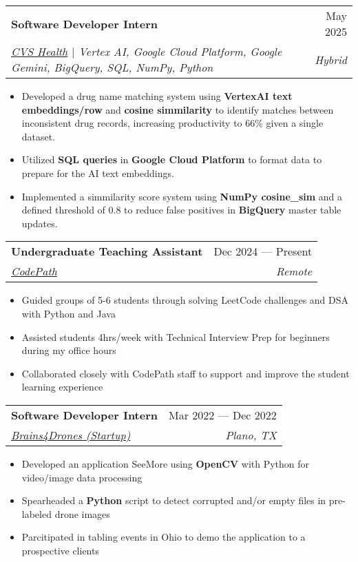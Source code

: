 \documentclass[letterpaper,11pt]{article}
\makeatletter
\newcommand{\resumeItem}[1]{
  \item\small{
    {#1 \vspace{-2pt}}
  }
}
\newcommand{\resumeSubheading}[4]{
  \vspace{-2pt}\item
    \begin{tabular*}{0.97\textwidth}[t]{l@{\extracolsep{\fill}}r}
      \textbf{#1} & #2 \\
      \textit{\small#3} & \textit{\small #4} \\
    \end{tabular*}\vspace{-7pt}
}
\newcommand{\resumeItemListStart}{\begin{itemize}}
\newcommand{\resumeItemListEnd}{\end{itemize}\vspace{-5pt}}
\makeatother
\begin{document}
    \resumeSubheading
      {Software Developer Intern}{May 2025}
      {\href{https://www.cvshealth.com/}{\underline{CVS Health}} $|$ \textit{Vertex AI}, \textit{Google Cloud Platform}, \textit{Google Gemini}, \textit{BigQuery}, \textit{SQL}, \textit{NumPy}, \textit{Python}}{Hybrid}
      \resumeItemListStart
        \resumeItem{Developed a drug name matching system using {\textbf{VertexAI text embeddings/row}} and {\textbf{cosine simmilarity}} to identify matches between inconsistent drug records, increasing productivity to 66\% given a single dataset.}
        \resumeItem{Utilized {\textbf{SQL queries}} in {\textbf{Google Cloud Platform}} to format data to prepare for the AI text embeddings.}
        \resumeItem{Implemented a simmilarity score system using {\textbf{NumPy cosine\_sim}} and a defined threshold of 0.8 to reduce false positives in {\textbf{BigQuery}} master table updates.}
        
    \resumeItemListEnd


    \resumeSubheading
      {Undergraduate Teaching Assistant}{Dec 2024 — Present}
      {\href{https://www.codepath.org/}{\underline{CodePath}}}{Remote}
      \resumeItemListStart
        \resumeItem{Guided groups of 5-6 students through solving LeetCode challenges and DSA with Python and Java}
        \resumeItem{Assisted students 4hrs/week with Technical Interview Prep for beginners during my office hours}
        \resumeItem{Collaborated closely with CodePath staff to support and improve the student learning experience}
      \resumeItemListEnd

    \resumeSubheading
      {Software Developer Intern}{Mar 2022 — Dec 2022}
      {\href{https://brains4drones.com/solutions/}{\underline{Brains4Drones (Startup)}}}{Plano, TX}
      \resumeItemListStart
        \resumeItem{Developed an application SeeMore using {\textbf{OpenCV}} with Python for video/image data processing}
        \resumeItem{Spearheaded a {\textbf{Python}} script to detect corrupted and/or empty files in pre-labeled drone images}
        \resumeItem{Parcitipated in tabling events in Ohio to demo the application to a prospective clients}
    \resumeItemListEnd

\end{document}
